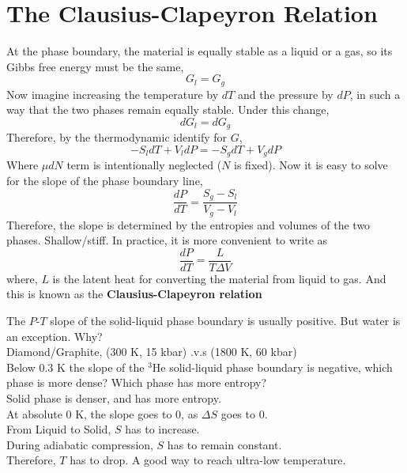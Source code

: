 \section{The Clausius-Clapeyron Relation}
At the phase boundary, the material is equally stable as a liquid or a gas, so its Gibbs free energy must be the same,
\begin{equation} G_l = G_g \end{equation}
Now imagine increasing the temperature by $dT$ and the pressure by $dP$, in such a way that the two phases remain equally stable.
Under this change,
\begin{equation} dG_l = dG_g \end{equation}
Therefore, by the thermodynamic identify for $G$,
\begin{equation} -S_ldT + V_ldP = -S_gdT + V_gdP \end{equation}
Where $\mu dN$ term is intentionally neglected ($N$ is fixed). 
Now it is easy to solve for the slope of the phase boundary line,
\begin{equation} \frac{dP}{dT} = \frac{S_g-S_l}{V_g-V_l} \end{equation}
Therefore, the slope is determined by the entropies and volumes of the two phases.
Shallow/stiff.
In practice, it is more convenient to write as
\begin{equation} \frac{dP}{dT} = \frac{L}{T\Delta{V}} \end{equation}
where, $L$ is the latent heat for converting the material from liquid to gas. And this is known as the {\bf Clausius-Clapeyron relation}

The $P$-$T$ slope of the solid-liquid phase boundary is usually positive. But water is an exception. Why?\\
Diamond/Graphite, (300 K, 15 kbar) .v.s (1800 K, 60 kbar)\\

Below 0.3 K the slope of the $^3$He solid-liquid phase boundary is negative, which phase is more dense? Which phase has more entropy?\\
Solid phase is denser, and has more entropy.\\
At absolute 0 K, the slope goes to 0, as $\Delta{S}$ goes to 0.\\
From Liquid to Solid, $S$ has to increase.\\
During adiabatic compression, $S$ has to remain constant.\\
Therefore, $T$ has to drop. A good way to reach ultra-low temperature.


